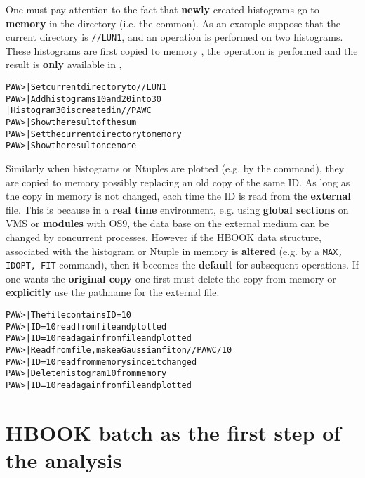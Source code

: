 One must pay attention to the fact that
{\bf newly} created histograms go to {\bf memory} in
the \IPAWCD{} directory (i.e. the \IPAWCC{} common).
As an example suppose that the current directory is \texttt{//LUN1},
and an operation is performed on two histograms. These histograms are
first copied to memory \IPAWCD, the operation is performed
and the result is {\bf only} available in \IPAWCD,
\begin{alltt}
 PAW >            | Set current directory to //LUN1
 PAW >           | Add histograms 10 and 20 into 30
                             | Histogram 30 is created in //PAWC
 PAW >   | Show the result of the sum
 PAW >              | Set the current directory to memory
 PAW >          | Show the result once more
\end{alltt}
Similarly when histograms or Ntuples are plotted
(e.g. by the  command), they are copied to memory
possibly replacing an old copy of the same ID.
As long as the copy in memory is not changed, each time the ID is read
from the {\bf external} file. This is because in a {\bf real time}
environment, e.g. using {\bf global sections} on VMS or
{\bf modules} with OS9, the data base on the external medium can be
changed by concurrent processes.
However if the HBOOK data structure, associated with the
histogram or Ntuple in memory is {\bf altered}
(e.g. by a \texttt{MAX, IDOPT, FIT} command), then it becomes
the {\bf default} for subsequent operations.
If one wants the {\bf original copy} one first must delete the
copy from memory or {\bf explicitly} use the pathname for the
external file.
\begin{alltt}
 PAW >   | The file contains ID=10
 PAW >          | ID=10 read from file and plotted
 PAW >              | ID=10 read again from file and plotted
 PAW >           | Read from file, make a Gaussian fit on //PAWC/10
 PAW >              | ID=10 read from memory since it changed
 PAW >               | Delete histogram 10 from memory
 PAW >              | ID=10 read again from file and plotted
\end{alltt}


\section{HBOOK batch as the first step of the analysis}
\label{sec-hbookbatch}


